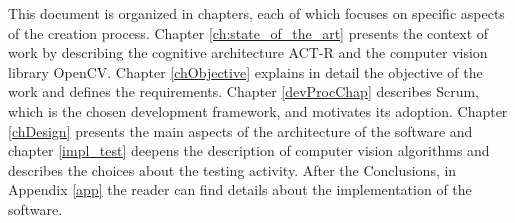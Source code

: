 	
	This document is organized in chapters, each of which focuses on specific aspects of the creation process.
	Chapter \ref{ch:state_of_the_art} presents the context of work by describing the cognitive architecture \mbox{ACT-R} and the computer vision library \mbox{OpenCV}.
	Chapter \ref{chObjective} explains in detail the objective of the work and defines the requirements.
	Chapter \ref{devProcChap} describes Scrum, which is the chosen development framework, and motivates its adoption.
	Chapter \ref{chDesign} presents the main aspects of the architecture of the software and chapter \ref{impl_test} deepens the description of computer vision algorithms and describes the choices about the testing activity.
	After the Conclusions, in Appendix \ref{app} the reader can find details about the implementation of the software.

	
	
	
	
	
	

 	
	
